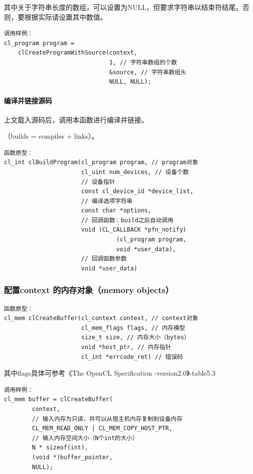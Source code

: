 \documentclass{ctexart}
\begin{document}
其中关于字符串长度的数组，可以设置为NULL，但要求字符串以结束符结尾。否则，要根据实际请设置其中数值。
\begin{verbatim}
调用样例：
cl_program program =
    clCreateProgramWithSource(context,
                              1, // 字符串数组的个数
                              &source, // 字符串数组头
                              NULL, NULL);
\end{verbatim}


\paragraph{编译并链接源码}
上文载入源码后，调用本函数进行编译并链接。

（builds = compiles + links）。
\begin{verbatim}
函数原型：
cl_int clBuildProgram(cl_program program, // program对象
                      cl_uint num_devices, // 设备个数
                      // 设备指针
                      const cl_device_id *device_list,
                      // 编译选项字符串
                      const char *options,
                      // 回调函数：build之后自动调用
                      void (CL_CALLBACK *pfn_notify)
                                (cl_program program,
                                void *user_data),
                      // 回调函数参数
                      void *user_data)
\end{verbatim}

\subsubsection{配置context 的内存对象（memory objects）}
\begin{verbatim}
函数原型：
cl_mem clCreateBuffer(cl_context context, // context对象
                      cl_mem_flags flags, // 内存模型
                      size_t size, // 内存大小（bytes）
                      void *host_ptr, // 内存指针
                      cl_int *errcode_ret) // 错误码
\end{verbatim}
其中flags具体可参考《The OpenCL Specification -version2.0》-table5.3


\begin{verbatim}
调用样例：
cl_mem buffer = clCreateBuffer(
        context,
        // 输入内存为只读，并可以从宿主机内存复制到设备内存
        CL_MEM_READ_ONLY | CL_MEM_COPY_HOST_PTR,
        // 输入内存空间大小（N个int的大小）
        N * sizeof(int),		
        (void *)buffer_pointer,
        NULL);
\end{verbatim}
\end{document}
